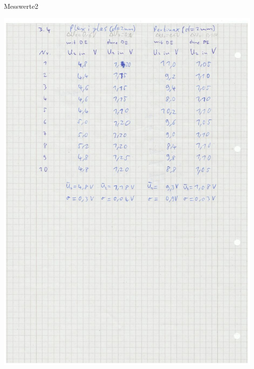 \begin{table}[h]
    \centering
    \caption[Messwerte2]{Messwerte2}
    \includegraphics[height=.75\textheight]{messungen/messwerte2.jpg}
    \label{tab:mess2}
\end{table}